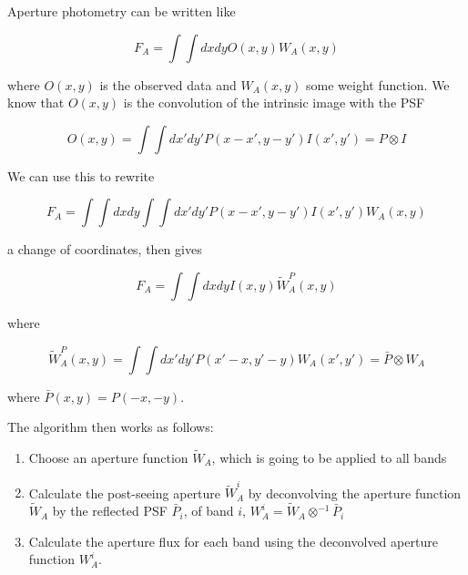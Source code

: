 

Aperture photometry can be written like

\begin{equation}
    F_A = \int\int dxdyO(x,y)W_A(x,y)
\end{equation}

where $O(x,y)$ is the observed data and $W_A(x,y)$ some weight function. We know that $O(x,y)$ is the convolution of the intrinsic image with the PSF

\begin{equation}
    O(x,y) = \int\int dx'dy'P(x-x', y-y')I(x',y')=P\otimes I
\end{equation}

We can use this to rewrite

\begin{equation}
    F_A = \int\int dxdy\int\int dx'dy'P(x-x', y-y')I(x',y')W_A(x,y)
\end{equation}

a change of coordinates, then gives

\begin{equation}
    F_A = \int\int dxdyI(x,y)\tilde{W}_A^P(x,y)
\end{equation}

where 

\begin{equation}
    \tilde{W}_A^P(x,y) = \int\int dx'dy'P(x'-x, y'-y)W_A(x',y')=\bar{P}\otimes W_A
\end{equation}

where $\bar{P}(x,y)=P(-x,-y)$.

The algorithm then works as follows:
\begin{enumerate}
    \item Choose an aperture function $\tilde{W}_A$, which is going to be applied to all bands
    \item Calculate the post-seeing aperture $\tilde{W}_A^i$ by deconvolving the aperture function $\tilde{W}_A$ by the reflected PSF $\bar{P}_i$, of band $i$, $W^i_A=\tilde{W}_A\otimes^{-1}\bar{P}_i$
    \item Calculate the aperture flux for each band using the deconvolved aperture function $W_A^i$.
\end{enumerate}
